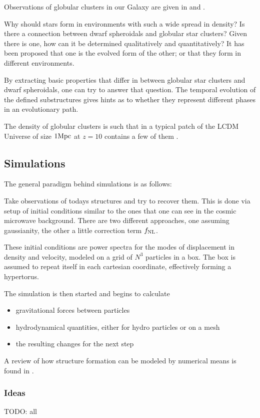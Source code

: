 \documentclass[useAMS,usenatbib]{mn2e}
\begin{document}
Observations of globular clusters in our Galaxy are given in
\citep{Zinn1985} and \citep{DeAngeli2005}.

Why should stars form in environments with such a wide spread in
density? Is there a connection between dwarf spheroidals and globular
star clusters? Given there is one, how can it be determined
qualitatively and quantitatively? It has been proposed \cite{TODO}
that one is the evolved form of the other; or \cite{TODO} that they
form in different environments.

By extracting basic properties that differ in between globular star
clusters and dwarf spheroidals, one can try to answer that
question. The temporal evolution of the defined substructures gives
hints as to whether they represent different phases in an evolutionary
path.

The density of globular clusters is such that in a typical patch of
the LCDM Universe of size $1\rm Mpc$ at $z=10$ contains a few of them
\citep{Boley2009}.

\subsection{Simulations}
The general paradigm behind simulations is as follows:

Take observations of todays structures and try to recover them. This
is done via setup of initial conditions similar to the ones that one
can see in the cosmic microwave background. There are two different
approaches, one assuming gaussianity, the other a little correction
term $f_{\rm NL}$.

These initial conditions are power spectra for the modes of
displacement in density and velocity, modeled on a grid of $N^3$
particles in a box. The box is assumed to repeat itself in each
cartesian coordinate, effectively forming a hypertorus.

The simulation is then started and begins to calculate 
\begin{itemize}
\item gravitational forces between particles
\item hydrodynamical quantities, either for hydro particles or on a mesh
\item the resulting changes for the next step
\end{itemize}

A review of how structure formation can be modeled by numerical means
is found in \citep{Bagla2005}.
\subsubsection{Ideas}
TODO: all
\end{document}
